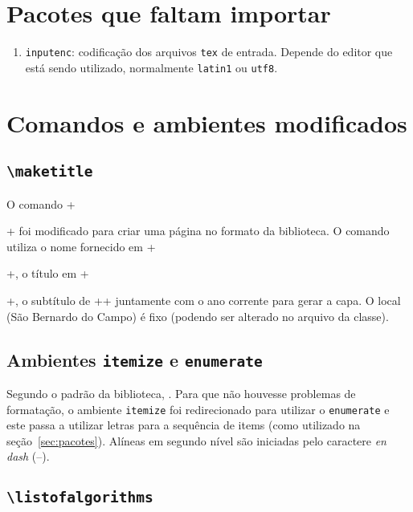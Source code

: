 \documentclass{fei}
\begin{document}
\section{Pacotes que faltam importar}

    \begin{enumerate}
        \item\texttt{inputenc}: codificação dos arquivos \texttt{tex} de entrada. Depende do editor que está sendo utilizado, normalmente \texttt{latin1} ou \texttt{utf8}.
    \end{enumerate}

\section{Comandos e ambientes modificados}
    
    \subsection{\texttt{\textbackslash maketitle}}
    
    O comando \latexinline+\maketitle+ foi modificado para criar uma página no formato da biblioteca. O comando utiliza o nome fornecido em \latexinline+\author{}+, o título em \latexinline+\title{}+, o subtítulo de \latexinline+\subtitulo{}+ juntamente com o ano corrente para gerar a capa. O local (São Bernardo do Campo) é fixo (podendo ser alterado no arquivo da classe).

    \subsection{Ambientes \texttt{itemize} e \texttt{enumerate}}
    
    Segundo o padrão da biblioteca, . Para que não houvesse problemas de formatação, o ambiente \texttt{itemize} foi redirecionado para utilizar o \texttt{enumerate} e este passa a utilizar letras para a sequência de items (como utilizado na seção~\ref{sec:pacotes}). Alíneas em segundo nível são iniciadas pelo caractere \emph{en dash} (--).
    
    \subsection{\texttt{\textbackslash listofalgorithms}}
    
\end{document}
